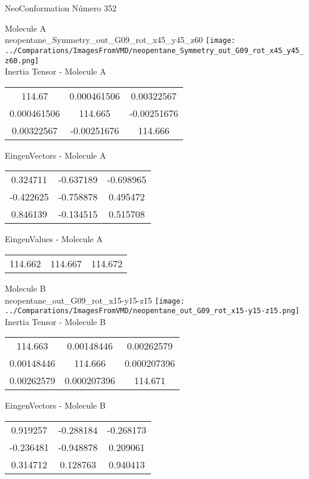 \vtab[-2cm]
\begin{center}
{\large NeoConformation \tab Número 352}
\end{center}
\begin{multicols}{2}
\begin{center}

Molecule A \\ 
neopentane\_Symmetry\_out\_G09\_rot\_x45\_y45\_z60
\texttt{[image: ../Comparations/ImagesFromVMD/neopentane\_Symmetry\_out\_G09\_rot\_x45\_y45\_z60.png]}
\\
Inertia Tensor - Molecule A \\
\vtab

\begin{tabular}{|c c c|}
114.67	 & 	0.000461506	 & 	0.00322567	 \\
0.000461506	 & 	114.665	 & 	-0.00251676	 \\
0.00322567	 & 	-0.00251676	 & 	114.666
\end{tabular}

\vtab
 EingenVectors - Molecule A     \\
\vtab
\begin{tabular}{|c c c|}
0.324711	 & 	-0.637189	 & 	-0.698965	 \\
-0.422625	 & 	-0.758878	 & 	0.495472	 \\
0.846139	 & 	-0.134515	 & 	0.515708
\end{tabular}

\vtab
 EingenValues - Molecule A     \\
\vtab
\begin{tabular}{|c c c|}
114.662	 & 	114.667	 & 	114.672	 \\
\end{tabular}
\columnbreak

Molecule B \\ 
neopentane\_out\_G09\_rot\_x15-y15-z15
\texttt{[image: ../Comparations/ImagesFromVMD/neopentane\_out\_G09\_rot\_x15-y15-z15.png]}
\\
Inertia Tensor - Molecule B \\
\vtab

\begin{tabular}{|c c c|}
114.663	 & 	0.00148446	 & 	0.00262579	 \\
0.00148446	 & 	114.666	 & 	0.000207396	 \\
0.00262579	 & 	0.000207396	 & 	114.671
\end{tabular}

\vtab
 EingenVectors - Molecule B     \\
\vtab
\begin{tabular}{|c c c|}
0.919257	 & 	-0.288184	 & 	-0.268173	 \\
-0.236481	 & 	-0.948878	 & 	0.209061	 \\
0.314712	 & 	0.128763	 & 	0.940413
\end{tabular}


\end{center}
\end{multicols}
